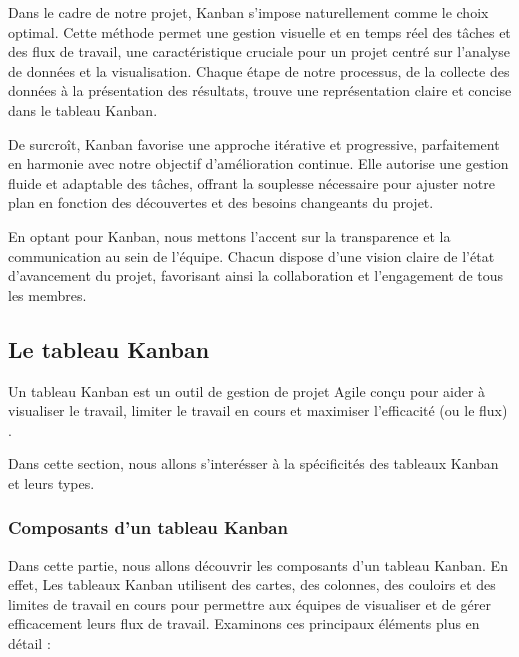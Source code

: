 \par Dans le cadre de notre projet, Kanban s'impose naturellement comme le choix optimal. 
Cette méthode permet une gestion visuelle et en temps réel des tâches et des flux de travail, une caractéristique cruciale pour un projet centré sur l'analyse de données et la visualisation.
Chaque étape de notre processus, de la collecte des données à la présentation des résultats, trouve une représentation claire et concise dans le tableau Kanban.

\par De surcroît, Kanban favorise une approche itérative et progressive, parfaitement en harmonie avec notre objectif d'amélioration continue. 
Elle autorise une gestion fluide et adaptable des tâches, offrant la souplesse nécessaire pour ajuster notre plan en fonction des découvertes et des besoins changeants du projet.

\par En optant pour Kanban, nous mettons l'accent sur la transparence et la communication au sein de l'équipe. 
Chacun dispose d'une vision claire de l'état d'avancement du projet, favorisant ainsi la collaboration et l'engagement de tous les membres.
\subsection{Le tableau Kanban}
\par Un tableau Kanban est un outil de gestion de projet Agile conçu pour aider à visualiser le travail, limiter le travail en cours et maximiser l'efficacité (ou le flux) \cite{kanban}.
\par Dans cette section, nous allons s'interésser à la spécificités des tableaux Kanban et leurs types.

\subsubsection{Composants d'un tableau Kanban}
\par Dans cette partie, nous allons découvrir les composants d'un tableau Kanban. En effet, Les tableaux Kanban utilisent des cartes, des colonnes, des couloirs et des limites de travail 
en cours pour permettre aux équipes de visualiser et de gérer efficacement leurs flux de travail. Examinons ces principaux éléments plus en détail :


